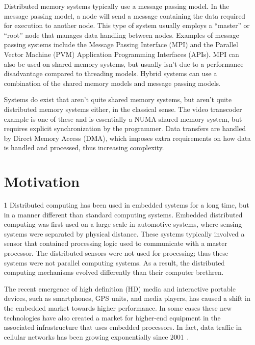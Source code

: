 Distributed memory systems typically use a message passing model. In the message passing model, a node will send a message containing the data required for execution to another node. This type of system usually employs a ``master'' or ``root'' node that manages data handling between nodes. Examples of message passing systems include the Message Passing Interface (MPI) and the Parallel Vector Machine (PVM) Application Programming Interfaces (APIs). MPI can also be used on shared memory systems, but usually isn't due to a performance disadvantage compared to threading models. Hybrid systems can use a combination of the shared memory models and message passing models. \cite{ref:2009-barney-introduction_to_parallel_computing}

Systems do exist that aren't quite shared memory systems, but aren't quite distributed memory systems either, in the classical sense. The video transcoder example is one of these and is essentially a NUMA shared memory system, but requires explicit synchronization by the programmer. Data transfers are handled by Direct Memory Access (DMA), which imposes extra requirements on how data is handled and processed, thus increasing complexity. 

\section{Motivation}\label{sec:introduction:motivation}

1 
Distributed computing has been used in embedded systems for a long time, but in a manner different than standard computing systems. Embedded distributed computing was first used on a large scale in automotive systems, where sensing systems were separated by physical distance. These systems typically involved a sensor that contained processing logic used to communicate with a master processor. The distributed sensors were not used for processing; thus these systems were not parallel computing systems. As a result, the distributed computing mechanisms evolved differently than their computer brethren.

The recent emergence of high definition (HD) media and interactive portable devices, such as smartphones, GPS units, and media players, has caused a shift in the embedded market towards higher performance. In some cases these new technologies have also created a market for higher-end equipment in the associated infrastructure that uses embedded processors. In fact, data traffic in cellular networks has been growing exponentially since 2001 \cite{ref:2008-ohult-the_mobile_broadband_evolution}.

